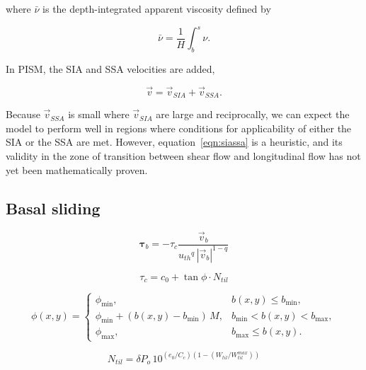 \documentclass{article}
\begin{document}
where $\bar{\nu}$ is the depth-integrated apparent viscosity defined by

\begin{equation}
    \bar{\nu} = \frac{1}{H}\int_b^s\nu.
\end{equation}

In PISM, the SIA and SSA velocities are added,

\begin{equation}
    \label{eqn:siassa}
    \vec{v} = \vec{v}_{SIA} + \vec{v}_{SSA}.
\end{equation}

Because $\vec{v}_{SSA}$ is small where $\vec{v}_{SIA}$ are large and
reciprocally, we can expect the model to perform well in regions where
conditions for applicability of either the SIA or the SSA are met. However,
equation~\ref{eqn:siassa} is a heuristic, and its validity in the zone of
transition between shear flow and longitudinal flow has not yet been
mathematically proven.

\subsection{Basal sliding}

\begin{equation}
    \bm{\tau}_b = -\tau_c \frac{\vec{v}_b}
                               {{u_{th}}^q\,|\vec{v}_b|^{1-q}}
\end{equation}

\begin{equation}
   \tau_c = c_{0} + \tan{\phi}\cdot N_{til}
\end{equation}

\newcommand{\phimin}{\phi_{\mathrm{min}}}
\newcommand{\phimax}{\phi_{\mathrm{max}}}
\newcommand{\bmin}{b_{\mathrm{min}}}
\newcommand{\bmax}{b_{\mathrm{max}}}

\begin{equation}
  \phi(x,y) =
  \begin{cases}
    \phimin, & b(x,y) \le \bmin, \\
    \phimin + (b(x,y) - \bmin) \,M, & \bmin < b(x,y) < \bmax, \\
    \phimax, & \bmax \le b(x,y).
  \end{cases}
  \label{eq:phipiecewise}
\end{equation}

\begin{equation}
N_{til} = \delta P_o \, 10^{(e_0/C_c)
          \left(1 - (W_{til}/W_{til}^{max})\right)}
\end{equation}
\end{document}
